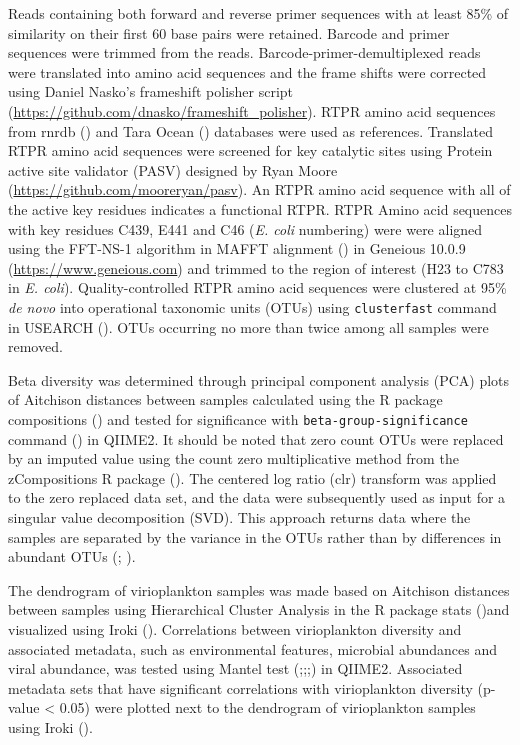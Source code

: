 \documentclass[a4,center,fleqn]{NAR}
\begin{document}
Reads containing both forward and reverse primer sequences with at least 85\% of similarity on their first 60 base pairs were retained.
Barcode and primer sequences were trimmed from the reads.
Barcode-primer-demultiplexed reads were translated into amino acid sequences and the frame shifts were corrected using Daniel Nasko’s frameshift polisher script (\url{https://github.com/dnasko/frameshift_polisher}). 
RTPR amino acid sequences from rnrdb (\cite{Lundin:2009aa}) and Tara Ocean (\cite{Pesant:2015aa}) databases were used as references.
Translated RTPR amino acid sequences were screened for key catalytic sites using Protein active site validator (PASV) designed by Ryan Moore (\url{https://github.com/mooreryan/pasv}).
An RTPR amino acid sequence with all of the active key residues indicates a functional RTPR. 
RTPR Amino acid sequences with key residues C439, E441 and C46 (\textit{E. coli} numbering) were were aligned using the FFT-NS-1 algorithm in MAFFT alignment (\cite{Katoh2002}) in Geneious 10.0.9 (\url{https://www.geneious.com}) and trimmed to the region of interest (H23 to C783 in \textit{E. coli}).
Quality-controlled RTPR amino acid sequences were clustered at 95\% \textit{de novo} into operational taxonomic units (OTUs) using \texttt{cluster\textunderscore fast} command in USEARCH (\cite{Edgar2010}). 
OTUs occurring no more than twice among all samples were removed.

Beta diversity was determined through principal component analysis (PCA) plots of Aitchison distances between samples calculated using the R package compositions (\cite{compositions}) and tested for significance with \texttt{beta-group-significance} command (\cite{Anderson:2001aa}) in QIIME2.
It should be noted that zero count OTUs were replaced by an imputed value using the count zero multiplicative method from the zCompositions R package (\cite{Palarea-Albaladejo:2015aa}). 
The centered log ratio (clr) transform was applied to the zero replaced data set, and the data were subsequently used as input for a singular value decomposition (SVD). This approach returns data where the samples are separated by the variance in the OTUs rather than by differences in abundant OTUs (\cite{Gloor2016}; \cite{Gloor2016_2}). 

The dendrogram of virioplankton samples was made based on Aitchison distances between samples using Hierarchical Cluster Analysis in the R package stats  (\cite{R})and visualized using Iroki (\cite{Moore2018}).
Correlations between virioplankton diversity and associated metadata, such as environmental features, microbial abundances and viral abundance, was tested using Mantel test  (\cite{Mantel1967};\cite{Pearson1895};\cite{Spearman2010};) in QIIME2.
Associated metadata sets that have significant correlations with virioplankton diversity (p-value < 0.05) were plotted next to the dendrogram of virioplankton samples using Iroki (\cite{Moore2018}).
\end{document}
